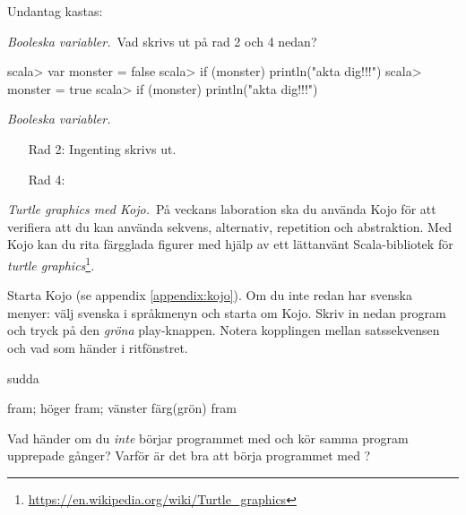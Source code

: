 \SubtaskSolved {}

\SubtaskSolved Undantag kastas: 

\SubtaskSolved {}

\QUESTEND





\def\what{\emph{Booleska variabler.}}

\QUESTBEGIN

\Task \what~Vad skrivs ut på rad 2 och 4 nedan?

\begin{REPL}
scala> var monster = false
scala> if (monster) println("akta dig!!!")
scala> monster = true
scala> if (monster) println("akta dig!!!")
\end{REPL}

\SOLUTION

\TaskSolved \what

\begin{itemize}
\item[Rad 2:] Ingenting skrivs ut.
\item[Rad 4:] 
\end{itemize}


\QUESTEND






\def\what{\emph{Turtle graphics med Kojo.}}

\QUESTBEGIN

\Task \what~På veckans laboration ska du använda Kojo för att verifiera att du kan använda sekvens, alternativ, repetition och abstraktion. Med Kojo kan du rita färgglada figurer med hjälp av ett lättanvänt Scala-bibliotek för \emph{turtle graphics}\footnote{\url{https://en.wikipedia.org/wiki/Turtle_graphics}}. 

Starta Kojo (se appendix \ref{appendix:kojo}). Om du inte redan har svenska menyer: välj svenska i språkmenyn och starta om Kojo.  Skriv in nedan program och tryck på den \emph{gröna} play-knappen. Notera kopplingen mellan satssekvensen och vad som händer i ritfönstret.

\begin{Code}
sudda

fram; höger
fram; vänster
färg(grön)
fram
\end{Code}
\noindent


\Subtask Vad händer om du \emph{inte} börjar programmet med  och kör samma program upprepade gånger? Varför är det bra att börja programmet med ?

